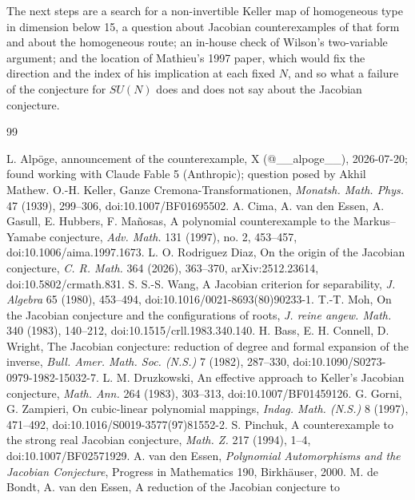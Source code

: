 \documentclass[11pt]{article}
\theoremstyle{remark}
\begin{document}
The next steps are a search for a non-invertible Keller map of homogeneous type in dimension below 15, a question about Jacobian counterexamples of that form and about the homogeneous route; an in-house check of Wilson's two-variable argument; and the location of Mathieu's 1997 paper, which would fix the direction and the index of his implication at each fixed $N$, and so what a failure of the conjecture for $SU(N)$ does and does not say about the Jacobian conjecture.

\begin{thebibliography}{99}\raggedright
{} L. Alp\"oge, announcement of the counterexample, X (@\_\_alpoge\_\_),
2026-07-20; found working with Claude Fable 5 (Anthropic); question posed by Akhil Mathew. %
 O.-H. Keller, Ganze Cremona-Transformationen, \emph{Monatsh. Math. Phys.} 47 (1939), 299--306, doi:10.1007/BF01695502.
 A. Cima, A. van den Essen, A. Gasull, E. Hubbers, F. Ma\~nosas, A polynomial counterexample to the Markus--Yamabe conjecture, \emph{Adv. Math.} 131 (1997), no. 2, 453--457, doi:10.1006/aima.1997.1673.
 L. O. Rodriguez Diaz, On the origin of the Jacobian conjecture, \emph{C. R. Math.} 364 (2026), 363--370, arXiv:2512.23614, doi:10.5802/crmath.831.
 S. S.-S. Wang, A Jacobian criterion for separability, \emph{J. Algebra} 65 (1980), 453--494, doi:10.1016/0021-8693(80)90233-1.
 T.-T. Moh, On the Jacobian conjecture and the configurations of roots, \emph{J. reine angew. Math.} 340 (1983), 140--212, doi:10.1515/crll.1983.340.140.
 H. Bass, E. H. Connell, D. Wright, The Jacobian conjecture: reduction of
degree and formal expansion of the inverse, \emph{Bull. Amer. Math. Soc. (N.S.)} 7 (1982),
287--330, doi:10.1090/S0273-0979-1982-15032-7.
 L. M. Druzkowski, An effective approach to Keller's Jacobian conjecture, \emph{Math. Ann.} 264 (1983), 303--313, doi:10.1007/BF01459126.
 G. Gorni, G. Zampieri, On cubic-linear polynomial mappings, \emph{Indag. Math. (N.S.)} 8 (1997), 471--492, doi:10.1016/S0019-3577(97)81552-2.
 S. Pinchuk, A counterexample to the strong real Jacobian conjecture, \emph{Math. Z.} 217 (1994), 1--4, doi:10.1007/BF02571929.
 A. van den Essen, \emph{Polynomial Automorphisms and the Jacobian Conjecture}, Progress in Mathematics 190, Birkh\"auser, 2000.
 M. de Bondt, A. van den Essen, A reduction of the Jacobian conjecture to

\end{thebibliography}
\end{document}
